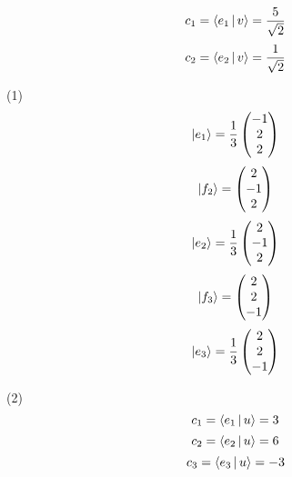 \exercise
\[
c_1 = \Braket{e_1|v} = \frac{5}{\sqrt{2}}
\]
\[
c_2 = \Braket{e_2|v} = \frac{1}{\sqrt{2}}
\]

\exercise

(1)
\[
\ket{e_1} = \frac13 \begin{pmatrix}
-1 \\ 2 \\ 2
\end{pmatrix}
\]
\[
\ket{f_2} = \begin{pmatrix}
2 \\ -1 \\ 2
\end{pmatrix}
\]
\[
\ket{e_2} = \frac13 \begin{pmatrix}
2 \\ -1 \\ 2
\end{pmatrix}
\]
\[
\ket{f_3} = \begin{pmatrix}
2 \\ 2 \\ -1
\end{pmatrix}
\]
\[
\ket{e_3} = \frac13 \begin{pmatrix}
2 \\ 2 \\ -1
\end{pmatrix}
\]

(2)
\[
c_1 = \Braket{e_1|u} = 3
\]
\[
c_2 = \Braket{e_2|u} = 6
\]
\[
c_3 = \Braket{e_3|u} = -3
\]

\exercise

